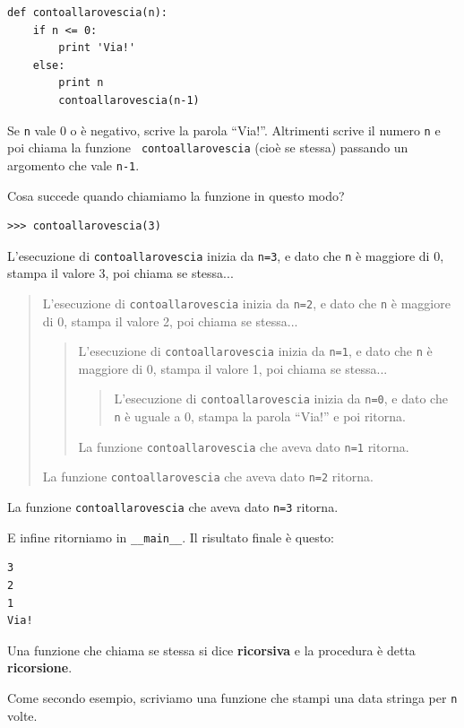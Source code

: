 \documentclass[10pt]{book}
\begin{document}
\begin{verbatim}
def contoallarovescia(n):
    if n <= 0:
        print 'Via!'
    else:
        print n
        contoallarovescia(n-1)
\end{verbatim}
%
Se {\tt n} vale 0 o è negativo, scrive la parola ``Via!''.
Altrimenti scrive il numero {\tt n} e poi chiama la funzione {\tt
contoallarovescia} (cioè se stessa) passando un argomento che vale {\tt n-1}.

Cosa succede quando chiamiamo la funzione in questo modo?

\begin{verbatim}
>>> contoallarovescia(3)
\end{verbatim}
%
L'esecuzione di {\tt contoallarovescia} inizia da {\tt n=3}, e dato che
{\tt n} è maggiore di 0, stampa il valore 3, poi chiama se stessa...

\begin{quote}
L'esecuzione di {\tt contoallarovescia} inizia da {\tt n=2}, e dato che
{\tt n} è maggiore di 0, stampa il valore 2, poi chiama se stessa...

\begin{quote}
L'esecuzione di {\tt contoallarovescia} inizia da {\tt n=1}, e dato che
{\tt n} è maggiore di 0, stampa il valore 1, poi chiama se stessa...

\begin{quote}
L'esecuzione di {\tt contoallarovescia} inizia da {\tt n=0}, e dato che {\tt
n} è uguale a 0, stampa la parola ``Via!'' e poi ritorna.
\end{quote}

La funzione {\tt contoallarovescia} che aveva dato {\tt n=1} ritorna.
\end{quote}

La funzione {\tt contoallarovescia} che aveva dato {\tt n=2} ritorna.
\end{quote}

La funzione {\tt contoallarovescia} che aveva dato {\tt n=3} ritorna.

E infine ritorniamo in \verb"__main__". Il risultato finale è questo:

\begin{verbatim}
3
2
1
Via!
\end{verbatim}
%
Una funzione che chiama se stessa si dice {\bf ricorsiva} e la procedura è detta
{\bf ricorsione}.

Come secondo esempio, scriviamo una funzione che stampi una data stringa per {\tt n} volte.
\end{document}
